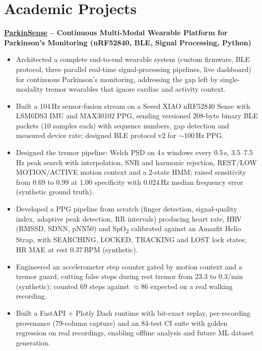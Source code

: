 \documentclass[10pt,letterpaper]{article}
\newcommand{\lnk}[2]{\href{#1}{\textcolor{linkblue}{#2}}}
\newcommand{\proj}[1]{\par\vspace{5pt}\textbf{#1}\par}
\begin{document}
\section{Academic Projects}
\proj{\lnk{https://github.com/sudo-pranshu/ParkinSense}{ParkinSense} -- Continuous Multi-Modal Wearable Platform for Parkinson's Monitoring \normalfont(nRF52840, BLE, Signal Processing, Python)}
\begin{itemize}
\item Architected a complete end-to-end wearable system (custom firmware, BLE protocol, three parallel real-time signal-processing pipelines, live dashboard) for continuous Parkinson's monitoring, addressing the gap left by single-modality tremor wearables that ignore cardiac and activity context.
\item Built a 104\,Hz sensor-fusion stream on a Seeed XIAO nRF52840 Sense with LSM6DS3 IMU and MAX30102 PPG, sending versioned 208-byte binary BLE packets (10 samples each) with sequence numbers, gap detection and measured device rate; designed BLE protocol v2 for $\sim$100\,Hz PPG.
\item Designed the tremor pipeline: Welch PSD on 4\,s windows every 0.5\,s, 3.5--7.5\,Hz peak search with interpolation, SNR and harmonic rejection, REST/LOW MOTION/ACTIVE motion context and a 2-state HMM; raised sensitivity from 0.69 to 0.99 at 1.00 specificity with 0.024\,Hz median frequency error (synthetic ground truth).
\item Developed a PPG pipeline from scratch (finger detection, signal-quality index, adaptive peak detection, RR intervals) producing heart rate, HRV (RMSSD, SDNN, pNN50) and SpO\textsubscript{2} calibrated against an Amazfit Helio Strap, with SEARCHING, LOCKED, TRACKING and LOST lock states; HR MAE at rest 0.37\,BPM (synthetic).
\item Engineered an accelerometer step counter gated by motion context and a tremor guard, cutting false steps during rest tremor from 23.3 to 0.3/min (synthetic); counted 69 steps against $\approx$86 expected on a real walking recording.
\item Built a FastAPI + Plotly Dash runtime with bit-exact replay, per-recording provenance (79-column capture) and an 84-test CI suite with golden regression on real recordings, enabling offline analysis and future ML dataset generation.
\end{itemize}
\end{document}
